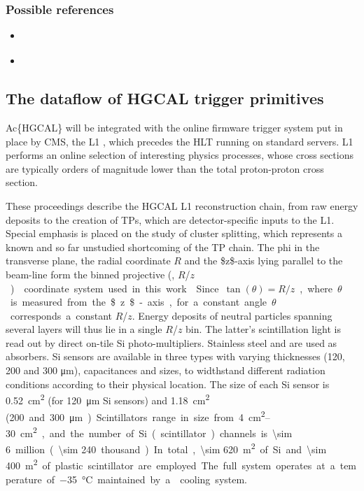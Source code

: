\documentclass[11pt]{article}
\newcommand{\coordsa}{(\si{\azi}, \si{\rz})}
\newcommand{\rz}{$R$/$z$}
\begin{document}
\subsubsection{Possible references}
\label{sec:org80f3fda}
\begin{itemize}
\item \cite{cms_offline_computing}
\item \cite{hgcalTDR}
\end{itemize}
\subsection{The dataflow of HGCAL trigger primitives}
\label{sec:orgc72ca8e}
Ac\{HGCAL\} will be integrated with the online firmware trigger system put in place by \ac{CMS}, the \ac{L1} \cite{l1TDR}, which precedes the \ac{HLT} running on standard servers.
\Ac{L1} performs an online selection of interesting physics processes, whose cross sections are typically orders of magnitude lower than the total proton-proton cross section.



These proceedings describe the \ac{HGCAL} \ac{L1} reconstruction chain, from raw energy deposits to the creation of \acp{TP}, which are detector-specific inputs to the \ac{L1}.
Special emphasis is placed on the study of cluster splitting, which represents a known and so far unstudied shortcoming of the \ac{TP} chain.
The \ac{phi} in the transverse plane, the radial coordinate \(R\) and the \$z\$-axis lying parallel to the beam-line form the binned projective \coordsa{} coordinate system used in this work \cite{cms_collab}.
Since \(\tan(\theta) = R/z\), where \(\theta\) is measured from the \$z\$-axis, for a constant angle \(\theta\) corresponds a constant \rz{}.
Energy deposits of neutral particles spanning several layers will thus lie in a single \rz{} bin.
The latter's scintillation light is read out by direct on-tile \ac{Si} photo-multipliers. Stainless steel and  are used as absorbers.
\ac{Si} sensors are available in three types with varying thicknesses (120, 200 and 300 \si{\micro\meter}), capacitances and sizes, to widthstand different radiation conditions according to their physical location.
The size of each \ac{Si} sensor is \SI{0.52}{\cm\squared} (for \SI{120}{\micro\meter} \ac{Si} sensors) and \SI{1.18}{\cm\squared} (\qty{200} and \SI{300}{\micro\meter}).
Scintillators range in size from \qtyrange{4}{30}{\cm\squared}, and the number of \ac{Si} (scintillator) channels is \num{\sim 6} million (\num{\sim 240} thousand).
In total, \SI{\sim 620}{\meter\squared} of \ac{Si} and \SI{\sim 400}{\meter\squared} of plastic scintillator are employed.
The full system operates at a temperature of \SI{-35}{\celsius} maintained by a  cooling system.
\end{document}
